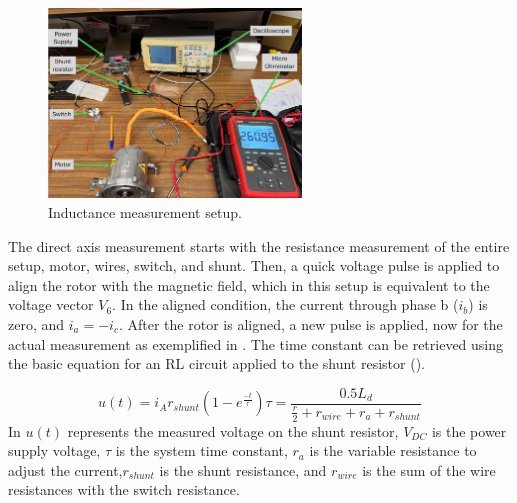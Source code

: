 \begin{figure}[!htb]
	\centering
	\includegraphics[width=0.6\textwidth]{Figures/induc_test.jpg}
	\caption[Inductance measurement setup.]{Inductance measurement setup.}
	\label{fig:induc_setup} %
\end{figure}

The direct axis measurement starts with the resistance measurement of the entire setup, motor, wires, switch, and shunt. Then, a quick voltage pulse is applied to align the rotor with the magnetic field, which in this setup is equivalent to the voltage vector $V_6$. In the aligned condition, the current through phase b ($i_b$) is zero, and $i_a = -i_c$. After the rotor is aligned, a new pulse is applied, now for the actual measurement as exemplified in . The time constant can be retrieved using the basic equation for an RL circuit applied to the shunt resistor ().

\begin{subequations}
	\begin{equation}
		u(t) = i_A r_{shunt}(1-e^{\frac{-t}{\tau}})
		\label{eq:rl_circuit}
	\end{equation}
	\begin{equation}
		\tau = \frac{0.5L_d}{\frac{r}{2}+r_{wire} + r_a + r_{shunt}}
		\label{eq:tau}
	\end{equation}
\end{subequations}
In  $u(t)$ represents the measured voltage on the shunt resistor, $V_{DC}$ is the power supply voltage, $\tau$ is the system time constant, $r_a$ is the variable resistance to adjust the current,$r_{shunt}$ is the shunt resistance, and $r_{wire}$ is the sum of the wire resistances with the switch resistance. 

